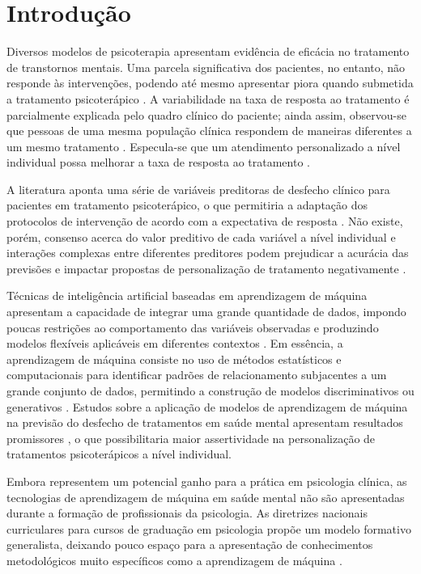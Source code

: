 \chapter{Introdução}

Diversos modelos de psicoterapia apresentam evidência de eficácia no tratamento de transtornos mentais. Uma parcela significativa dos pacientes,
no entanto, não responde às intervenções, podendo até mesmo apresentar piora quando submetida a tratamento psicoterápico \cite{Cuijpers2021}. A
variabilidade na taxa de resposta ao tratamento é parcialmente explicada pelo quadro clínico do paciente; ainda assim, observou-se que pessoas
de uma mesma população clínica respondem de maneiras diferentes a um mesmo tratamento \cite{Hofmann2012}. Especula-se que um atendimento personalizado
a nível individual possa melhorar a taxa de resposta ao tratamento \cite{Norcross2010, Norcross2018}.

A literatura aponta uma série de variáveis preditoras de desfecho clínico para pacientes em tratamento psicoterápico, o que permitiria a adaptação
dos protocolos de intervenção de acordo com a expectativa de resposta \cite{Smagula2019, Andover2020}. Não existe, porém, consenso acerca do valor
preditivo de cada variável a nível individual e interações complexas entre diferentes preditores podem prejudicar a acurácia das previsões e impactar
propostas de personalização de tratamento negativamente \cite{Taubitz2022}.

Técnicas de inteligência artificial baseadas em aprendizagem de máquina apresentam a capacidade de integrar uma grande quantidade de dados, impondo
poucas restrições ao comportamento das variáveis observadas e produzindo modelos flexíveis aplicáveis em diferentes contextos \cite{Dwyer2018}. Em
essência, a aprendizagem de máquina consiste no uso de métodos estatísticos e computacionais para identificar padrões de relacionamento subjacentes
a um grande conjunto de dados, permitindo a construção de modelos discriminativos ou generativos \cite{Roth2018}. Estudos sobre a aplicação de modelos
de aprendizagem de máquina na previsão do desfecho de tratamentos em saúde mental apresentam resultados promissores \cite{Dwyer2018}, o que possibilitaria
maior assertividade na personalização de tratamentos psicoterápicos a nível individual.

Embora representem um potencial ganho para a prática em psicologia clínica, as tecnologias de aprendizagem de máquina em saúde mental não são apresentadas
durante a formação de profissionais da psicologia. As diretrizes nacionais curriculares para cursos de graduação em psicologia propõe um modelo formativo
generalista, deixando pouco espaço para a apresentação de conhecimentos metodológicos muito específicos como a aprendizagem de máquina \cite{CNE2023, Ruda2019}.

